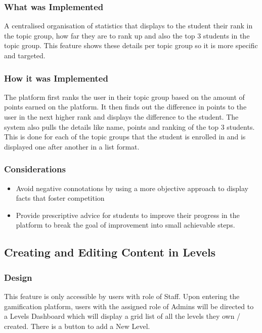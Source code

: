 \subsubsection{What was Implemented}
A centralised organisation of statistics that displays to the student their rank in the topic group, how far they are to rank up and also the top 3 students in the topic group. This feature shows these details per topic group so it is more specific and targeted.

\subsubsection{How it was Implemented}
The platform first ranks the user in their topic group based on the amount of points earned on the platform. It then finds out the difference in points to the user in the next higher rank and displays the difference to the student. The system also pulls the details like name, points and ranking of the top 3 students. This is done for each of the topic groups that the student is enrolled in and is displayed one after another in a list format.

\subsubsection{Considerations}
\begin{itemize}
    \item Avoid negative connotations by using a more objective approach to display facts that foster competition
    \item Provide prescriptive advice for students to improve their progress in the platform to break the goal of improvement into small achievable steps.
\end{itemize}

\newpage

\subsection{Creating and Editing Content in Levels}
\subsubsection{Design}
This feature is only accessible by users with role of Staff. Upon entering the gamification platform, users with the assigned role of Admins will be directed to a Levels Dashboard which will display a grid list of all the levels they own / created. There is a button to add a New Level.

